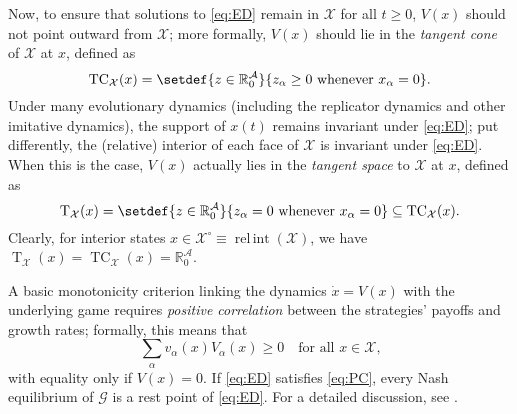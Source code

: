 \documentclass[reqno]{amsart}
\theoremstyle{plain}
\theoremstyle{definition}
\theoremstyle{remark}
\numberwithin{equation}{section}
\numberwithin{theorem}{section}
\begin{document}
Now, to ensure that solutions to \eqref{eq:ED} remain in ${\mathcal{X}}$ for all $t\geq0$, ${V}(x)$ should not point outward from ${\mathcal{X}}$;
more formally, ${V}(x)$ should lie in the \emph{tangent cone} of ${\mathcal{X}}$ at $x$, defined as
\begin{equation}
\label{eq:tcone-simplex}
\operatorname{TC}_{\mathcal{X}}(x)
	= \setdef{z\in{\mathbb{R}}_{0}^{\mathcal{A}}}{z_\alpha \geq 0 \text{ whenever } x_{\alpha} = 0}.
\end{equation}
Under many evolutionary dynamics (including the replicator dynamics and other imitative dynamics), the support of $x(t)$ remains invariant under \eqref{eq:ED};
put differently, the (relative) interior of each face of ${\mathcal{X}}$ is invariant under \eqref{eq:ED}.
When this is the case, ${V}(x)$ actually lies in the \emph{tangent space} to ${\mathcal{X}}$ at $x$, defined as
\begin{equation}
\label{eq:tspace-simplex}
\operatorname{T}_{\mathcal{X}}(x)
	= \setdef{z\in{\mathbb{R}}^{\mathcal{A}}_0}{z_\alpha = 0\text{ whenever }x_\alpha=0}
	\subseteq \operatorname{TC}_{\mathcal{X}}(x).
\end{equation}
Clearly, for interior states $x\in{{\mathcal{X}}^{\circ}} \equiv \operatorname{rel\,int}({\mathcal{X}})$, we have $\operatorname{T}_{\mathcal{X}}(x) = \operatorname{TC}_{\mathcal{X}}(x) = {\mathbb{R}}_{0}^{\mathcal{A}}$.

A basic monotonicity criterion linking the dynamics $\dot x = {V}(x)$ with the underlying game
requires \emph{positive correlation} between the strategies' payoffs and growth rates;
formally, this means that
\begin{equation}
\label{eq:PC}
\tag{PC}
{\sum\nolimits}_{\alpha} {v}_\alpha(x) {V}_\alpha(x)
	\geq 0
	\quad
	\text{for all $x \in {\mathcal{X}}$,}
\end{equation}
with equality only if ${V}(x)=0$.
If \eqref{eq:ED} satisfies \eqref{eq:PC}, every Nash equilibrium of ${\mathcal{G}}$ is a rest point of \eqref{eq:ED}.
For a detailed discussion, see \cite{San10}.
\end{document}
